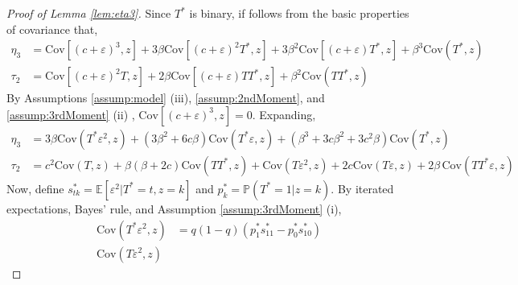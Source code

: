 \begin{proof}[Proof of Lemma \ref{lem:eta3}]
  Since $T^*$ is binary, if follows from the basic properties of covariance that,
\begin{align*}
  \eta_3 &= \mbox{Cov}\left[ (c + \varepsilon)^3,z \right] + 3 \beta \mbox{Cov}[(c + \varepsilon)^2 T^*, z] + 3 \beta^2 \mbox{Cov}[(c + \varepsilon)T^*,z] + \beta^3 \mbox{Cov}(T^*,z)\\
  \tau_2 &= \mbox{Cov}\left[ (c + \varepsilon)^2 T, z \right] + 2 \beta \mbox{Cov}\left[ (c + \varepsilon)TT^*,z \right] + \beta^2 \mbox{Cov}(TT^*,z)
\end{align*}
By Assumptions \ref{assump:model} (iii), \ref{assump:2ndMoment}, and \ref{assump:3rdMoment} (ii) , $\mbox{Cov}\left[ (c + \varepsilon)^3,z \right] = 0$.
Expanding, 
\begin{align*}
  \eta_3 %
  &= 3 \beta \mbox{Cov}(T^*\varepsilon^2,z) + \left(3 \beta^2 + 6c\beta \right)\mbox{Cov}(T^*\varepsilon,z) + \left( \beta^3 + 3c\beta^2 + 3c^2\beta \right)\mbox{Cov}(T^*, z)\\
  \tau_2 &= c^2 \mbox{Cov}(T,z) + \beta(\beta + 2c) \mbox{Cov}(TT^*,z) + \mbox{Cov}(T\varepsilon^2,z) + 2c \mbox{Cov}(T\varepsilon,z) + 2\beta\,\mbox{Cov}(TT^*\varepsilon,z)
\end{align*}
Now, define $s^*_{tk} = \mathbb{E}[\varepsilon^2|T^*=t, z=k]$ and $p_k^* = \mathbb{P}(T^*=1|z=k)$.
By iterated expectations, Bayes' rule, and Assumption \ref{assump:3rdMoment} (i), 
\begin{align*}
  \mbox{Cov}(T^*\varepsilon^2, z) %
  &= q(1 - q)(p^*_1 s^*_{11} - p^*_0 s^*_{10}) \\
  \mbox{Cov}(T\varepsilon^2, z) %

\end{align*}
\end{proof}
